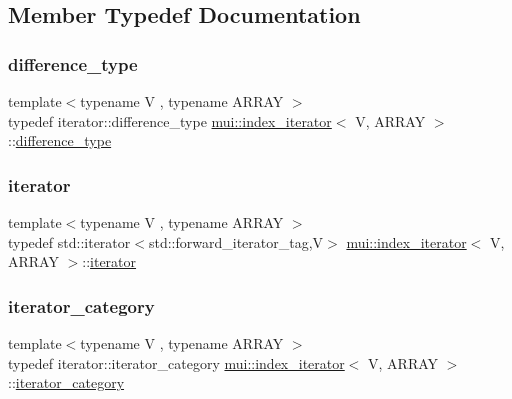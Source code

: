 \subsection{Member Typedef Documentation}
\mbox{\label{structmui_1_1index__iterator_a1c78c601f90f622d37e36255c6e7260a}} 
\subsubsection{\texorpdfstring{difference\+\_\+type}{difference\_type}}
{\footnotesize\ttfamily template$<$typename V , typename A\+R\+R\+AY $>$ \\
typedef iterator\+::difference\+\_\+type \hyperlink{structmui_1_1index__iterator}{mui\+::index\+\_\+iterator}$<$ V, A\+R\+R\+AY $>$\+::\hyperlink{structmui_1_1index__iterator_a1c78c601f90f622d37e36255c6e7260a}{difference\+\_\+type}}

\mbox{\label{structmui_1_1index__iterator_aceb32ff6af026ed8662f9fb30ea5cbe7}} 
\subsubsection{\texorpdfstring{iterator}{iterator}}
{\footnotesize\ttfamily template$<$typename V , typename A\+R\+R\+AY $>$ \\
typedef std\+::iterator$<$std\+::forward\+\_\+iterator\+\_\+tag,V$>$ \hyperlink{structmui_1_1index__iterator}{mui\+::index\+\_\+iterator}$<$ V, A\+R\+R\+AY $>$\+::\hyperlink{structmui_1_1index__iterator_aceb32ff6af026ed8662f9fb30ea5cbe7}{iterator}}

\mbox{\label{structmui_1_1index__iterator_a3a8f9b635405aaa0a076020be25cbf0b}} 
\subsubsection{\texorpdfstring{iterator\+\_\+category}{iterator\_category}}
{\footnotesize\ttfamily template$<$typename V , typename A\+R\+R\+AY $>$ \\
typedef iterator\+::iterator\+\_\+category \hyperlink{structmui_1_1index__iterator}{mui\+::index\+\_\+iterator}$<$ V, A\+R\+R\+AY $>$\+::\hyperlink{structmui_1_1index__iterator_a3a8f9b635405aaa0a076020be25cbf0b}{iterator\+\_\+category}}

